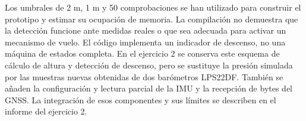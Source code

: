 \documentclass[11pt,a4paper]{article}
\begin{document}
Los umbrales de 2 m, 1 m y 50 comprobaciones se han utilizado
para construir el prototipo y estimar su ocupación de memoria.
La compilación no demuestra que la detección funcione ante
medidas reales o que sea adecuada para activar un mecanismo
de vuelo. El código implementa un indicador de descenso, no
una máquina de estados completa.
En el ejercicio 2 se conserva este esquema de cálculo de altura y detección
de descenso, pero se sustituye la presión simulada por las muestras nuevas
obtenidas de dos barómetros LPS22DF. También se añaden la configuración y
lectura parcial de la IMU y la recepción de bytes del GNSS. La integración
de esos componentes y sus límites se describen en el informe del ejercicio 2.
\end{document}
